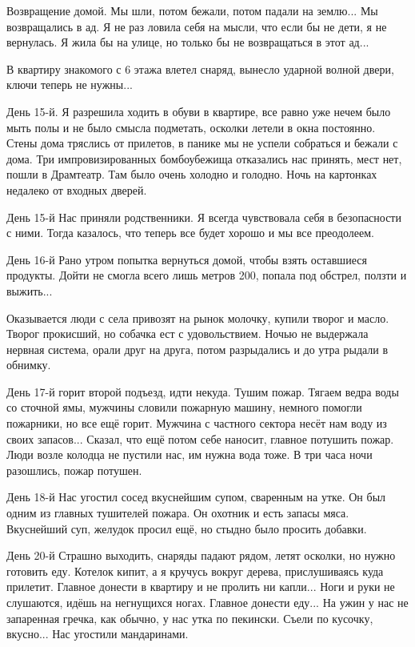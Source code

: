 Возвращение домой. Мы шли, потом бежали, потом падали на землю... Мы
возвращались в ад. Я не раз ловила себя на мысли, что если бы не дети, я не
вернулась. Я жила бы на улице, но только бы не возвращаться в этот ад... 

В квартиру знакомого с 6 этажа влетел снаряд, вынесло ударной волной двери,
ключи теперь не нужны...

День 15-й. Я разрешила ходить в обуви в квартире, все равно уже нечем было мыть
полы и не было смысла подметать, осколки летели в окна постоянно. Стены дома
тряслись от прилетов, в панике мы не успели собраться и бежали с дома. Три
импровизированных бомбоубежища отказались нас принять, мест нет, пошли в
Драмтеатр. Там было очень холодно и голодно. Ночь на картонках недалеко от
входных дверей.

День 15-й Нас приняли родственники. Я всегда чувствовала себя в безопасности с
ними. Тогда казалось, что теперь все будет хорошо и мы все преодолеем.

День 16-й Рано утром попытка вернуться домой, чтобы взять оставшиеся продукты.
Дойти не смогла всего лишь метров 200, попала под обстрел, ползти и выжить... 

Оказывается люди с села привозят на рынок молочку, купили творог и масло.
Творог прокисший, но собачка ест с удовольствием. Ночью не выдержала нервная
система, орали друг на друга, потом разрыдались и до утра рыдали в обнимку.

День 17-й горит второй подъезд, идти некуда. Тушим пожар. Тягаем ведра воды со
сточной ямы, мужчины словили пожарную машину, немного помогли пожарники, но все
ещё горит. Мужчина с частного сектора несёт нам воду из своих запасов...
Сказал, что ещё потом себе наносит, главное потушить пожар. Люди возле колодца
не пустили нас, им нужна вода тоже. В три часа ночи разошлись, пожар потушен.

День 18-й Нас угостил сосед вкуснейшим супом, сваренным на утке. Он был одним
из главных тушителей пожара. Он охотник и есть запасы мяса. Вкуснейший суп,
желудок просил ещё, но стыдно было просить добавки. 

День 20-й Страшно выходить, снаряды падают рядом, летят осколки, но нужно
готовить еду. Котелок кипит, а я кручусь вокруг дерева, прислушиваясь куда
прилетит. Главное донести в квартиру и не пролить ни капли... Ноги и руки не
слушаются, идёшь на негнущихся ногах. Главное донести еду... На ужин у нас не
запаренная гречка, как обычно, у нас утка по пекински. Съели по кусочку,
вкусно... Нас угостили мандаринами.

